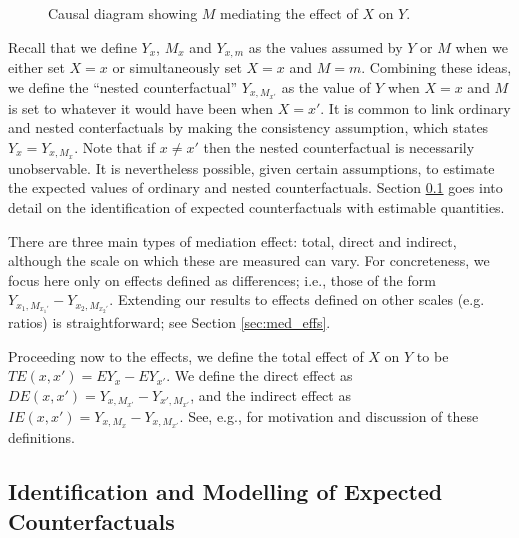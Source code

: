 \documentclass{article}
\begin{document}
\begin{figure}
    \centering
      \caption{Causal diagram showing $M$ mediating the effect of $X$ on $Y$.}    
      \label{fig:simp_med}
\end{figure}

Recall that we define $Y_x$, $M_x$ and $Y_{x,m}$ as the values assumed by $Y$ or $M$ when we either set $X=x$ or simultaneously set $X=x$ and $M=m$. Combining these ideas, we define the ``nested counterfactual'' $Y_{x, M_{x'}}$ as the value of $Y$ when $X=x$ and $M$ is set to whatever it would have been when $X=x'$. It is common to link ordinary and nested conterfactuals by making the consistency assumption, which states $Y_x = Y_{x, M_x}$. Note that if $x \neq x'$ then the nested counterfactual is necessarily unobservable. It is nevertheless possible, given certain assumptions, to estimate the expected values of ordinary and nested counterfactuals. Section \ref{sec:ID} goes into detail on the identification of expected counterfactuals with estimable quantities.

There are three main types of mediation effect: total, direct and indirect, although the scale on which these are measured can vary. For concreteness, we focus here only on effects defined as differences; i.e., those of the form $Y_{x_1, M_{x_1'}} - Y_{x_2, M_{x_2'}}$. Extending our results to effects defined on other scales (e.g. ratios) is straightforward; see Section \ref{sec:med_effs}.

Proceeding now to the effects, we define the total effect of $X$ on $Y$ to be $TE(x, x') = EY_x - EY_{x'}$. We define the direct effect as $DE(x, x') = Y_{x, M_{x'}} - Y_{x', M_{x'}}$, and the indirect effect as $IE(x, x') = Y_{x, M_{x}} - Y_{x, M_{x'}}$. See, e.g., \citet{Pea12} for motivation and discussion of these definitions.





\subsection{Identification and Modelling of Expected Counterfactuals}
\label{sec:ID}
\end{document}
